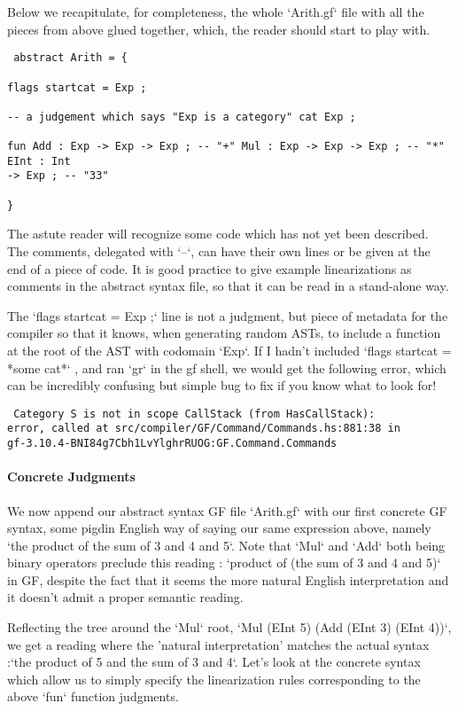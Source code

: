 Below we recapitulate, for completeness, the whole `Arith.gf` file with all the
pieces from above glued together, which, the reader should start to play with.

\begin{verbatim} abstract Arith = {

flags startcat = Exp ;

-- a judgement which says "Exp is a category" cat Exp ;

fun Add : Exp -> Exp -> Exp ; -- "+" Mul : Exp -> Exp -> Exp ; -- "*" EInt : Int
-> Exp ; -- "33"

}
\end{verbatim}

The astute reader will recognize some code which has not yet been described. The
comments, delegated with `--`, can have their own lines or be given at the end
of a piece of code. It is good practice to give example linearizations as
comments in the abstract syntax file, so that it can be read in a stand-alone
way.

The `flags startcat = Exp ;` line is not a judgment, but piece of metadata for
the compiler so that it knows, when generating random ASTs, to include a
function at the root of the AST with codomain `Exp`. If I hadn't included `flags
startcat = *some cat*` , and ran `gr` in the gf shell, we would get the
following error, which can be incredibly confusing but simple bug to fix if you
know what to look for!

\begin{verbatim} Category S is not in scope CallStack (from HasCallStack):
error, called at src/compiler/GF/Command/Commands.hs:881:38 in
gf-3.10.4-BNI84g7Cbh1LvYlghrRUOG:GF.Command.Commands
\end{verbatim}


\paragraph{Concrete Judgments}

We now append our abstract syntax GF file `Arith.gf` with our first concrete GF
syntax, some pigdin English way of saying our same expression above, namely `the
product of the sum of 3 and 4 and 5`. Note that `Mul` and `Add` both being
binary operators preclude this reading : `product of (the sum of 3 and 4 and 5)`
in GF, despite the fact that it seems the more natural English interpretation
and it doesn't admit a proper semantic reading.

Reflecting the tree around the `Mul` root, `Mul (EInt 5) (Add (EInt 3) (EInt
4))`, we get a reading where the 'natural interpretation' matches the actual
syntax :`the product of 5 and the sum of 3 and 4`. Let's look at the concrete
syntax which allow us to simply specify the linearization rules corresponding to
the above `fun` function judgments.

